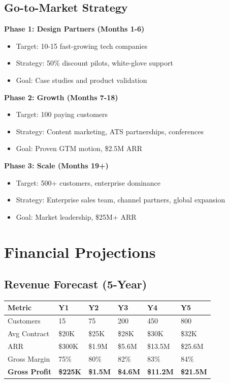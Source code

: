 \documentclass[11pt,letterpaper]{article}
\begin{document}
\subsection{Go-to-Market Strategy}

\textbf{Phase 1: Design Partners (Months 1-6)}
\begin{itemize}[noitemsep]
    \item Target: 10-15 fast-growing tech companies
    \item Strategy: 50\% discount pilots, white-glove support
    \item Goal: Case studies and product validation
\end{itemize}

\textbf{Phase 2: Growth (Months 7-18)}
\begin{itemize}[noitemsep]
    \item Target: 100 paying customers
    \item Strategy: Content marketing, ATS partnerships, conferences
    \item Goal: Proven GTM motion, \$2.5M ARR
\end{itemize}

\textbf{Phase 3: Scale (Months 19+)}
\begin{itemize}[noitemsep]
    \item Target: 500+ customers, enterprise dominance
    \item Strategy: Enterprise sales team, channel partners, global expansion
    \item Goal: Market leadership, \$25M+ ARR
\end{itemize}


\section{Financial Projections}

\subsection{Revenue Forecast (5-Year)}

\begin{table}[H]
\centering
\small
\begin{tabularx}{\textwidth}{lXXXXX}
\toprule
\textbf{Metric} & \textbf{Y1} & \textbf{Y2} & \textbf{Y3} & \textbf{Y4} & \textbf{Y5} \\
\midrule
Customers & 15 & 75 & 200 & 450 & 800 \\
Avg Contract & \$20K & \$25K & \$28K & \$30K & \$32K \\
ARR & \$300K & \$1.9M & \$5.6M & \$13.5M & \$25.6M \\
Gross Margin & 75\% & 80\% & 82\% & 83\% & 84\% \\
\textbf{Gross Profit} & \textbf{\$225K} & \textbf{\$1.5M} & \textbf{\$4.6M} & \textbf{\$11.2M} & \textbf{\$21.5M} \\
\bottomrule
\end{tabularx}
\end{table}
\end{document}

